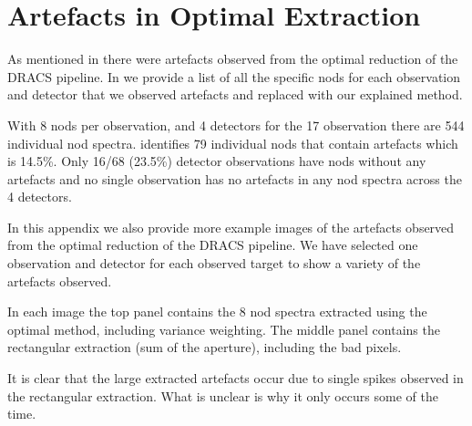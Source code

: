 
\chapter{Artefacts in Optimal Extraction} %
\label{appendix:artefacts}



As mentioned in  there were artefacts observed from the optimal reduction of the DRACS pipeline. In  we provide a list of all the specific nods for each observation and detector that we observed artefacts and replaced with our explained method.

With 8 nods per observation, and 4 detectors for the 17 observation there are 544 individual nod spectra.  identifies 79 individual nods that contain artefacts which is 14.5\%. Only 16/68 (23.5\%) detector observations have nods without any artefacts and no single observation has no artefacts in any nod spectra across the 4 detectors.


In this appendix we also provide more example images of the artefacts observed from the optimal reduction of the DRACS pipeline. We have selected one observation and detector for each observed target to show a variety of the artefacts observed.

In each image the top panel contains the 8 nod spectra extracted using the optimal method, including variance weighting. The middle panel contains the rectangular extraction (sum of the aperture), including the bad pixels.

It is clear that the large extracted artefacts occur due to single spikes observed in the rectangular extraction. What is unclear is why it only occurs some of the time.



